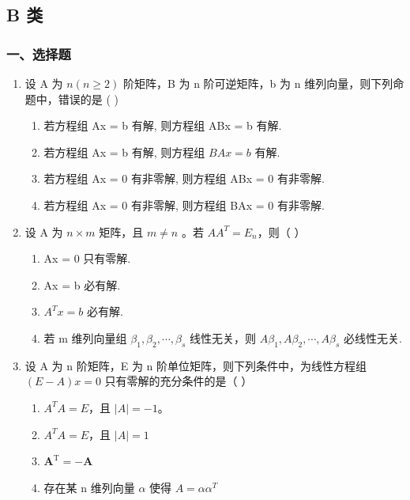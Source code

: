 \documentclass[12pt, a4paper]{ctexart}
\begin{document}
\subsection{B 类}

\subsubsection*{一、选择题}

\begin{enumerate}
    \item 设 A 为 $ n (n \geq 2) $ 阶矩阵，B 为 n 阶可逆矩阵，b 为 n 维列向量，则下列命题中，错误的是 ( \underline{\hspace{1cm}} )
    \begin{enumerate}[label=(\Alph*)]
        \item 若方程组 Ax = b 有解, 则方程组 ABx = b 有解.
        \item 若方程组 Ax = b 有解, 则方程组 $ BAx = b $ 有解.
        \item 若方程组 Ax = 0 有非零解, 则方程组 ABx = 0 有非零解.
        \item 若方程组 Ax = 0 有非零解, 则方程组 BAx = 0 有非零解.
    \end{enumerate}

    \item 设 A 为 $ n \times m $ 矩阵，且 $ m \neq n $ 。若 $ AA^{T} = E_{n} $，则（ \underline{\hspace{1cm}} ）
    \begin{enumerate}[label=(\Alph*)]
        \item Ax = 0 只有零解.
        \item Ax = b 必有解.
        \item $ A^{T}x=b $ 必有解.
        \item 若 m 维列向量组 $ \beta_{1},\beta_{2},\cdots,\beta_{s} $ 线性无关，则 $ A\beta_{1},A\beta_{2},\cdots,A\beta_{s} $ 必线性无关.
    \end{enumerate}

    \item 设 A 为 n 阶矩阵，E 为 n 阶单位矩阵，则下列条件中，为线性方程组 $ (E-A)x=0 $ 只有零解的充分条件的是（ \underline{\hspace{1cm}} ）
    \begin{enumerate}[label=(\Alph*)]
        \item $ A^{T}A = E $，且 $ |A| = -1 $。
        \item $ A^{T}A=E $，且 $ |A|=1 $
        \item $ \mathbf{A}^{\mathrm{T}} = -\mathbf{A} $
        \item 存在某 n 维列向量 $\alpha$ 使得 $ A = \alpha \alpha^{T} $
    \end{enumerate}


\end{enumerate}
\end{document}
